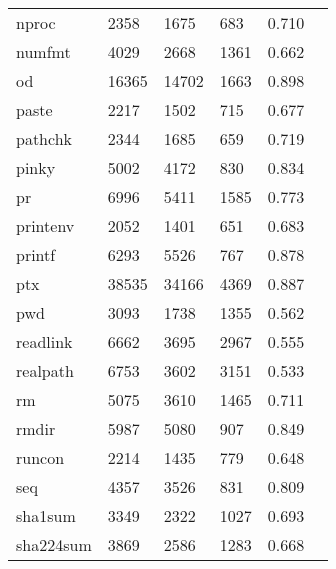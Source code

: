 \begin{longtable}{lp{2.40cm}p{2.40cm}p{2.40cm}p{2.40cm}p{2.40cm}}
nproc     &                     2358 &         1675 &           683 &                    0.710 \\
numfmt    &                     4029 &         2668 &          1361 &                    0.662 \\
od        &                    16365 &        14702 &          1663 &                    0.898 \\
paste     &                     2217 &         1502 &           715 &                    0.677 \\
pathchk   &                     2344 &         1685 &           659 &                    0.719 \\
pinky     &                     5002 &         4172 &           830 &                    0.834 \\
pr        &                     6996 &         5411 &          1585 &                    0.773 \\
printenv  &                     2052 &         1401 &           651 &                    0.683 \\
printf    &                     6293 &         5526 &           767 &                    0.878 \\
ptx       &                    38535 &        34166 &          4369 &                    0.887 \\
pwd       &                     3093 &         1738 &          1355 &                    0.562 \\
readlink  &                     6662 &         3695 &          2967 &                    0.555 \\
realpath  &                     6753 &         3602 &          3151 &                    0.533 \\
rm        &                     5075 &         3610 &          1465 &                    0.711 \\
rmdir     &                     5987 &         5080 &           907 &                    0.849 \\
runcon    &                     2214 &         1435 &           779 &                    0.648 \\
seq       &                     4357 &         3526 &           831 &                    0.809 \\
sha1sum   &                     3349 &         2322 &          1027 &                    0.693 \\
sha224sum &                     3869 &         2586 &          1283 &                    0.668 \\

\end{longtable}
